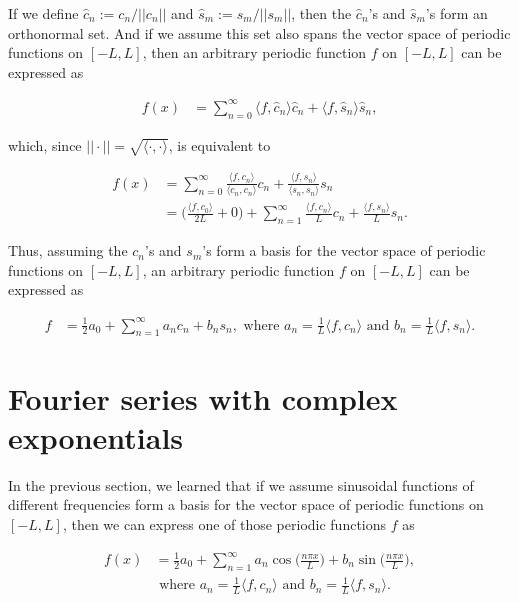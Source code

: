 \documentclass{article}
\begin{document}
If we define $\hat{c}_n := c_n/||c_n||$ and $\hat{s}_m := s_m/||s_m||$, then the $\hat{c}_n$'s and $\hat{s}_m$'s form an orthonormal set. And if we assume this set also spans the vector space of periodic functions on $[-L, L]$, then an arbitrary periodic function $f$ on $[-L, L]$ can be expressed as

\begin{align*}
	f(x) &= \sum_{n = 0}^{\infty} \langle f, \hat{c}_n \rangle \hat{c}_n + \langle f, \hat{s}_n \rangle \hat{s}_n,
\end{align*}

which, since $||\cdot|| = \sqrt{\langle \cdot, \cdot \rangle}$, is equivalent to

\begin{align*}
	f(x) &= \sum_{n = 0}^{\infty} \frac{\langle f, c_n \rangle}{\langle c_n, c_n \rangle}c_n + \frac{\langle f, s_n \rangle}{\langle s_n, s_n \rangle}s_n \\
	&= \Big(\frac{\langle f, c_0 \rangle}{2L} + 0\Big) + \sum_{n = 1}^{\infty} \frac{\langle f, c_n \rangle}{L}c_n + \frac{\langle f, s_n \rangle}{L} s_n.
\end{align*}

Thus, assuming the $c_n$'s and $s_m$'s form a basis for the vector space of periodic functions on $[-L, L]$, an arbitrary periodic function $f$ on $[-L, L]$ can be expressed as

\begin{align*}
	f &= \frac{1}{2} a_0 + \sum_{n = 1}^\infty a_n c_n + b_n s_n, \text{ where $a_n = \frac{1}{L} \langle f, c_n \rangle$ and $b_n = \frac{1}{L} \langle f, s_n \rangle$}.
\end{align*}

\newpage

\section*{Fourier series with complex exponentials}

In the previous section, we learned that if we assume sinusoidal functions of different frequencies form a basis for the vector space of periodic functions on $[-L, L]$, then we can express one of those periodic functions $f$ as

\begin{align*}
	f(x) &= \frac{1}{2} a_0 + \sum_{n = 1}^\infty a_n \cos\Big(\frac{n\pi x}{L}\Big) + b_n \sin\Big(\frac{n\pi x}{L}\Big), \\
	&\text{ where $a_n = \frac{1}{L} \langle f, c_n \rangle$ and $b_n = \frac{1}{L} \langle f, s_n \rangle$}.
\end{align*}
\end{document}
